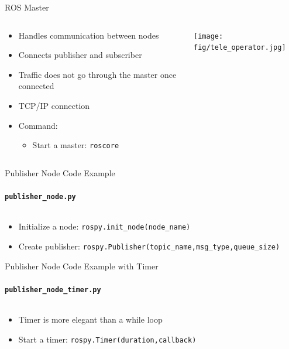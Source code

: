 \documentclass{beamer}
\newcommand{\pyinline}[1]{\texttt{#1}}
\newcommand{\inline}[1]{\texttt{#1}}
\begin{document}
\begin{frame}{ROS Master}
	\begin{columns}[T]
		\begin{column}{0.6\textwidth}
			\begin{itemize}
			\item Handles communication between nodes
			\item Connects publisher and subscriber
			\item Traffic does \alert{not} go through the master once connected
			\item TCP/IP connection
			\item Command:
				\begin{itemize}
					\item Start a master: \inline{roscore}
				\end{itemize}
			\end{itemize}
		\end{column}
		\begin{column}{0.4\textwidth}
			\centering
			\texttt{[image: fig/tele\_operator.jpg]}
		\end{column}
	\end{columns}
\end{frame}

\begin{frame}{Publisher Node Code Example}
	\framesubtitle{\texttt{publisher\_node.py}}
	\inputminted{python}{snippet/publisher_node.py}
	\begin{itemize}
		\item Initialize a node: \pyinline{rospy.init_node(node_name)}
		\item Create publisher: \pyinline{rospy.Publisher(topic_name,msg_type,queue_size)}
	\end{itemize}
\end{frame}

\begin{frame}{Publisher Node Code Example with Timer}
	\framesubtitle{\texttt{publisher\_node\_timer.py}}
	\inputminted{python}{snippet/publisher_node_timer.py}
	\begin{itemize}
	\item Timer is more elegant than a while loop
	\item Start a timer: \pyinline{rospy.Timer(duration,callback)}
	\end{itemize}
\end{frame}
\end{document}
